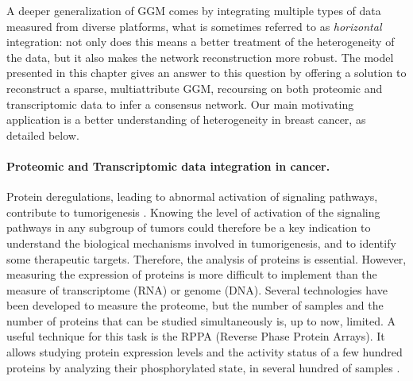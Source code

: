 A deeper generalization of GGM comes by integrating multiple types of
data measured from diverse platforms, what is sometimes referred to as
\emph{horizontal} integration: not only does this means a better
treatment of the heterogeneity of the data, but it also makes the
network reconstruction more robust. The model presented in this
chapter gives an answer to this question by offering a solution to
reconstruct a sparse, multiattribute GGM, recoursing on both proteomic
and transcriptomic data to infer a consensus network. Our main motivating
application is a better understanding of heterogeneity in breast
cancer, as detailed below.

\paragraph*{Proteomic and Transcriptomic data integration in cancer.} 
Protein deregulations, leading to abnormal activation of signaling
pathways, contribute to tumorigenesis
\citep{giancotti2014deregulation}. Knowing the level of activation of
the signaling pathways in any subgroup of tumors could therefore be a
key indication to understand the biological mechanisms involved in
tumorigenesis, and to identify some therapeutic targets.  %
%
Therefore, the analysis of proteins is
essential.  However, measuring the expression of proteins is more
difficult to implement than the measure of transcriptome (RNA) or
genome (DNA).  Several technologies have been developed to measure the
proteome, but the number of samples and the number of proteins that
can be studied simultaneously is, up to now, limited.  A useful
technique for this task is the RPPA (Reverse Phase Protein
Arrays). It allows studying protein expression levels and the activity
status of a few hundred proteins by analyzing their phosphorylated
state, in several hundred of samples \citep{akbani2014realizing}.

